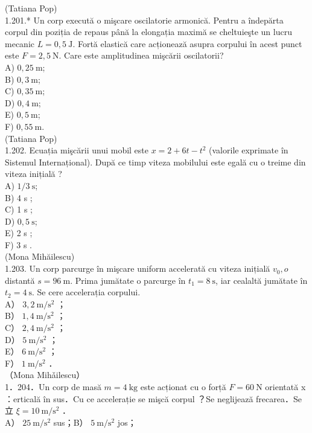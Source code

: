 \documentclass[10pt]{article}
\begin{document}
(Tatiana Pop)\\
1.201.* Un corp execută o mişcare oscilatorie armonică. Pentru a îndepărta corpul din poziția de repaus până la elongația maximă se cheltuieşte un lucru mecanic $L=0,5 \mathrm{~J}$. Fortă elastică care acționează asupra corpului în acest punct este $F=2,5 \mathrm{~N}$. Care este amplitudinea mişcării oscilatorii?\\
A) $0,25 \mathrm{~m}$;\\
B) $0,3 \mathrm{~m}$;\\
C) $0,35 \mathrm{~m}$;\\
D) $0,4 \mathrm{~m}$;\\
E) $0,5 \mathrm{~m}$;\\
F) $0,55 \mathrm{~m}$.\\
(Tatiana Pop)\\
1.202. Ecuația mişcării unui mobil este $x=2+6 t-t^{2}$ (valorile exprimate în Sistemul Internațional). După ce timp viteza mobilului este egală cu o treime din viteza inițială ?\\
A) $1 / 3 \mathrm{~s}$;\\
B) 4 s ;\\
C) 1 s ;\\
D) $0,5 \mathrm{~s}$;\\
E) 2 s ;\\
F) 3 s .\\
(Mona Mihăilescu)\\
1.203. Un corp parcurge în mişcare uniform accelerată cu viteza inițială $v_{0}, o$ distantă $s=96 \mathrm{~m}$. Prima jumătate o parcurge în $t_{1}=8 \mathrm{~s}$, iar cealaltă jumătate în $t_{2}=4 \mathrm{~s}$. Se cere accelerația corpului.\\
A） $3,2 \mathrm{~m} / \mathrm{s}^{2}$ ；\\
B） $1,4 \mathrm{~m} / \mathrm{s}^{2}$ ；\\
C） $2,4 \mathrm{~m} / \mathrm{s}^{2}$ ；\\
D） $5 \mathrm{~m} / \mathrm{s}^{2}$ ；\\
E） $6 \mathrm{~m} / \mathrm{s}^{2}$ ；\\
F） $1 \mathrm{~m} / \mathrm{s}^{2}$ ．\\
（Mona Mihǎilescu）\\
1．204．Un corp de masă $m=4 \mathrm{~kg}$ este acționat cu o forță $F=60 \mathrm{~N}$ orientată x ：erticală în sus．Cu ce accelerație se mişcă corpul ？Se neglijează frecarea．Se立 $\xi=10 \mathrm{~m} / \mathrm{s}^{2}$ ．\\
A） $25 \mathrm{~m} / \mathrm{s}^{2}$ sus；B） $5 \mathrm{~m} / \mathrm{s}^{2}$ jos；\\
\end{document}
